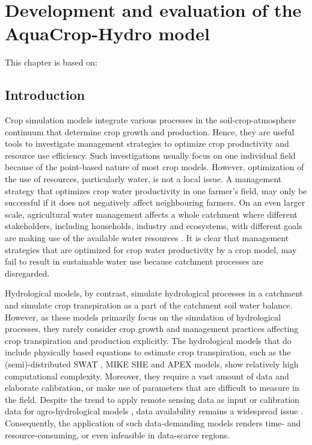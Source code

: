 \chapter{Development and evaluation of the AquaCrop-Hydro model}
\label{ch:aquacrophydro}

This chapter is based on:\\

\section{Introduction} \label{sec:ch6_intro} 
Crop simulation models integrate various processes in the soil-crop-atmosphere continuum that determine crop growth and production. Hence, they are useful tools to investigate management strategies to optimize crop productivity and resource use efficiency. Such investigations usually focus on one individual field because of the point-based nature of most crop models. However, optimization of the use of resources, particularly water, is not a local issue. A management strategy that optimizes crop water productivity in one farmer's field, may only be successful if it does not negatively affect neighbouring farmers. On an even larger scale, agricultural water management affects a whole catchment where different stakeholders, including households, industry and ecosystems, with different goals are making use of the available water resources \parencite{bergez2012}. It is clear that management strategies that are optimized for crop water productivity by a crop model, may fail to result in sustainable water use because catchment processes are disregarded. 

Hydrological models, by contrast, simulate hydrological processes in a catchment and simulate crop transpiration as a part of the catchment soil water balance. However, as these models primarily focus on the simulation of hydrological processes, they rarely consider crop growth and management practices affecting crop transpiration and production explicitly. The hydrological models that do include physically based equations to estimate crop transpiration, such as the (semi)-distributed SWAT \parencite{arnold1998a,douglasmankin2010}, MIKE SHE \parencite{refsgaard1995} and APEX \parencite{gassman2010} models, show relatively high computational complexity. Moreover, they require a vast amount of data and elaborate calibration, or make use of parameters that are difficult to measure in the field. Despite the trend to apply remote sensing data as input or calibration data for agro-hydrological models \parencite{boegh2004, moulin1998}, data availability remains a widespread issue \parencite{grayson2002}. Consequently, the application of such data-demanding models renders time- and resource-consuming, or even infeasible in data-scarce regions. 

